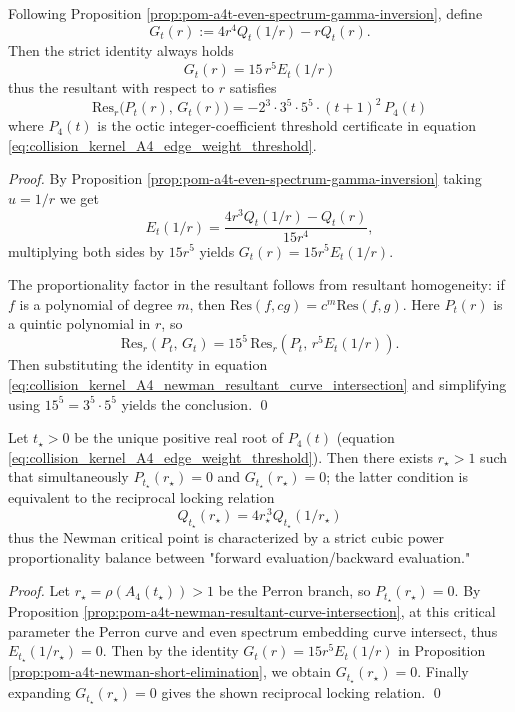 

\begin{proposition}\label{prop:pom-a4t-newman-short-elimination}
Following Proposition \ref{prop:pom-a4t-even-spectrum-gamma-inversion}, define
\[
G_t(r):=4r^4Q_t(1/r)-rQ_t(r).
\]
Then the strict identity always holds
\[
\boxed{\;G_t(r)=15\,r^5E_t(1/r)\;}
\]
thus the resultant with respect to \(r\) satisfies
\[
\boxed{\;
\mathrm{Res}_r\!\bigl(P_t(r),\,G_t(r)\bigr)
=-2^3\cdot 3^5\cdot 5^5\cdot (t+1)^2\,P_4(t)\;}
\]
where \(P_4(t)\) is the octic integer-coefficient threshold certificate in equation \eqref{eq:collision_kernel_A4_edge_weight_threshold}.
\end{proposition}
\begin{proof}
By Proposition \ref{prop:pom-a4t-even-spectrum-gamma-inversion} taking \(u=1/r\) we get
\[
E_t(1/r)=\frac{4r^3Q_t(1/r)-Q_t(r)}{15r^4},
\]
multiplying both sides by \(15r^5\) yields \(G_t(r)=15r^5E_t(1/r)\).
\par
The proportionality factor in the resultant follows from resultant homogeneity: if \(f\) is a polynomial of degree \(m\), then \(\mathrm{Res}(f,cg)=c^{m}\mathrm{Res}(f,g)\).
Here \(P_t(r)\) is a quintic polynomial in \(r\), so
\[
\mathrm{Res}_r(P_t,\,G_t)=15^5\,\mathrm{Res}_r(P_t,\,r^5E_t(1/r)).
\]
Then substituting the identity in equation \eqref{eq:collision_kernel_A4_newman_resultant_curve_intersection} and simplifying using \(15^5=3^5\cdot 5^5\) yields the conclusion. \qed
\end{proof}

\begin{proposition}\label{prop:pom-a4t-newman-reciprocal-locking}
Let \(t_\star>0\) be the unique positive real root of \(P_4(t)\) (equation \eqref{eq:collision_kernel_A4_edge_weight_threshold}).
Then there exists \(r_\star>1\) such that simultaneously \(P_{t_\star}(r_\star)=0\) and \(G_{t_\star}(r_\star)=0\);
the latter condition is equivalent to the reciprocal locking relation
\[
\boxed{\;
Q_{t_\star}(r_\star)=4r_\star^{\,3}Q_{t_\star}(1/r_\star)\;}
\]
thus the Newman critical point is characterized by a strict cubic power proportionality balance between "forward evaluation/backward evaluation."
\end{proposition}
\begin{proof}
Let \(r_\star=\rho(A_4(t_\star))>1\) be the Perron branch, so \(P_{t_\star}(r_\star)=0\).
By Proposition \ref{prop:pom-a4t-newman-resultant-curve-intersection}, at this critical parameter the Perron curve and even spectrum embedding curve intersect,
thus \(E_{t_\star}(1/r_\star)=0\).
Then by the identity \(G_t(r)=15r^5E_t(1/r)\) in Proposition \ref{prop:pom-a4t-newman-short-elimination}, we obtain \(G_{t_\star}(r_\star)=0\).
Finally expanding \(G_{t_\star}(r_\star)=0\) gives the shown reciprocal locking relation. \qed
\end{proof}

